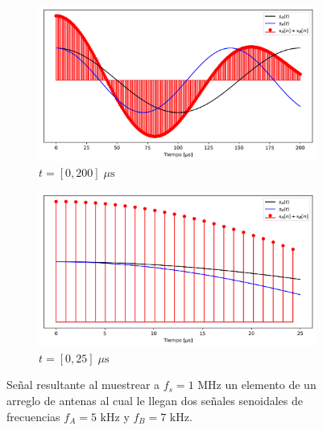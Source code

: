 \begin{figure}[ht!]
    \centering
    \begin{subfigure}[b]{0.9\textwidth}
        \centering
        \includegraphics[width=\linewidth]{images/04-Random Sampling/sa_sb.png}
        \caption{$t=[0,200]\; \mu \textrm{s}$}
        \label{fig:rs_sa_sb}
    \end{subfigure}
    \hfill
    \begin{subfigure}[b]{0.9\textwidth}
        \centering
        \includegraphics[width=\linewidth]{images/04-Random Sampling/sa_sb_15.png}
        \caption{$t=[0,25]\; \mu \textrm{s}$}
        \label{fig:rs_sa_sb_15}
    \end{subfigure}
    \caption{Señal resultante al muestrear a $f_s=1\textrm{ MHz}$ un elemento de un arreglo de antenas al cual le llegan dos señales senoidales de frecuencias $f_A=5\textrm{ kHz}$ y $f_B={7\textrm{ kHz}}$.}
\end{figure}

